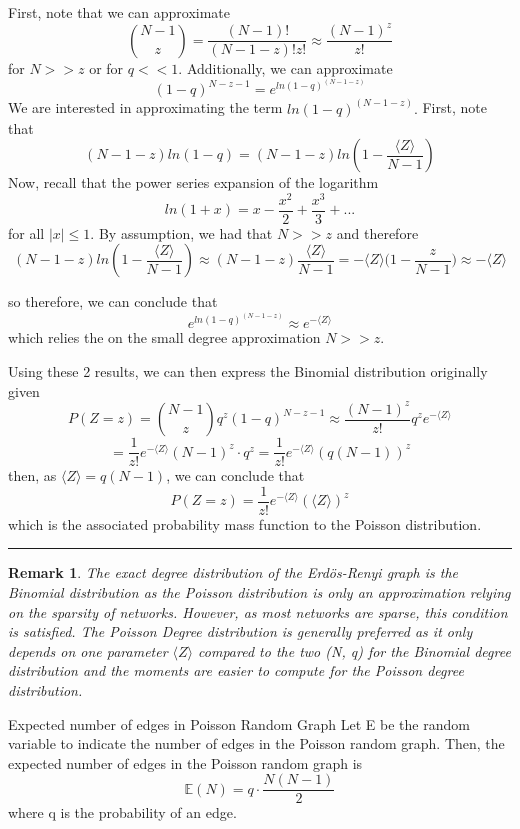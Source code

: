 \documentclass[twoside]{article}
\newtheorem{remark}[theorem]{Remark}
\newenvironment{proof}{{\bf Proof:}}{\hfill\rule{2mm}{2mm}}
\begin{document}
\begin{proof} First, note that we can approximate 
$$
{N - 1 \choose z} = \frac{(N - 1)!}{(N - 1 - z)!z!} \approx \frac{(N - 1)^z}{z!}
$$
for $N >> z$ or for $q << 1.$ Additionally, we can approximate 
$$
(1 - q)^{N - z - 1} = e^{ln(1 - q)^{(N - 1 - z)}}
$$
We are interested in approximating the term $ln(1 - q)^{(N - 1 - z)}.$ First, note that 
$$
(N - 1 - z)ln(1 - q) = (N - 1 - z)ln(1 - \frac{\langle Z \rangle}{N - 1})
$$
Now, recall that the power series expansion of the logarithm 
$$
ln(1 + x) = x - \frac{x^2}{2} + \frac{x^3}{3} + ...
$$
for all $|x| \leq 1.$ By assumption, we had that $N >> z$ and therefore 
$$
(N - 1 - z)ln(1 - \frac{\langle Z \rangle}{N - 1}) \approx (N - 1 - z)\frac{\langle Z \rangle}{N - 1} = -\langle Z \rangle\bigg(1 - \frac{z}{N - 1}) \approx -\langle Z \rangle
$$

so therefore, we can conclude that 
$$
e^{ln(1 - q)^{(N - 1 - z)}} \approx e^{- \langle Z \rangle}
$$
which relies the on the small degree approximation $N >> z.$

Using these 2 results, we can then express the Binomial distribution originally given 
$$
P(Z=z) = {N - 1 \choose z}q^z(1 - q)^{N - z - 1} \approx \frac{(N - 1)^z}{z!} q^z e^{- \langle Z \rangle}
$$
$$
= \frac{1}{z!} e^{- \langle Z \rangle} (N - 1)^z \cdot q^z = \frac{1}{z!} e^{- \langle Z \rangle} (q(N - 1))^z
$$
then, as $\langle Z \rangle = q(N - 1)$, we can conclude that 
$$
P(Z=z) = \frac{1}{z!} e^{-\langle Z \rangle} (\langle Z \rangle)^z
$$
which is the associated probability mass function to the Poisson distribution.
\end{proof}

\begin{remark} The exact degree distribution of the Erdös-Renyi graph is the Binomial distribution as the Poisson distribution is only an approximation relying on the sparsity of networks. However, as most networks are sparse, this condition is satisfied. The Poisson Degree distribution is generally preferred as it only depends on one parameter $\langle Z \rangle$ compared to the two (N, q) for the Binomial degree distribution and the moments are easier to compute for the Poisson degree distribution.
\end{remark}

\begin{proposition_exam}{Expected number of edges in Poisson Random Graph}{} Let E be the random variable to indicate the number of edges in the Poisson random graph. Then, the expected number of edges in the Poisson random graph is
$$
\mathbb{E}(N) = q \cdot \frac{N(N - 1)}{2}
$$
where q is the probability of an edge.
\end{proposition_exam}
\end{document}
